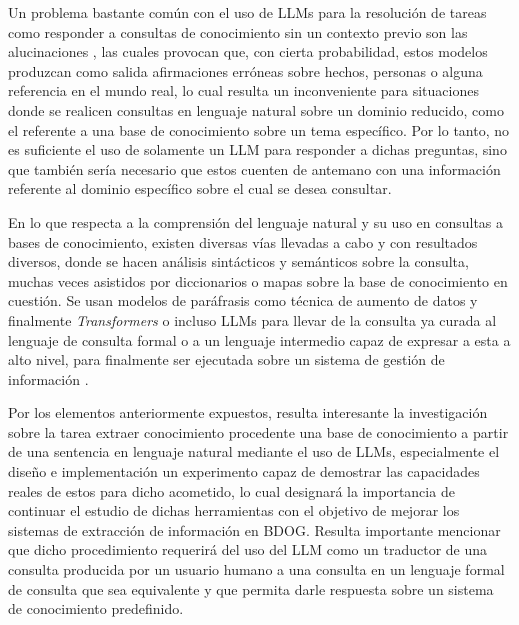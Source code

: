 Un problema bastante común con el uso de LLMs para la resolución de tareas como responder a consultas de conocimiento sin un contexto previo son las alucinaciones \cite{llmhallucinations}, las cuales provocan que, con cierta probabilidad, estos modelos produzcan como salida afirmaciones erróneas sobre hechos, personas o alguna referencia en el mundo real, lo cual resulta un inconveniente para situaciones donde se realicen consultas en lenguaje natural sobre un dominio reducido, como el referente a una base de conocimiento sobre un tema específico. Por lo tanto, no es suficiente el uso de solamente un LLM para responder a dichas preguntas, sino que también sería necesario que estos cuenten de antemano con una información referente al dominio específico sobre el cual se desea consultar.

En lo que respecta a la comprensión del lenguaje natural y su uso en consultas a bases de conocimiento, existen diversas vías llevadas a cabo y con resultados diversos, donde se hacen análisis sintácticos y semánticos sobre la consulta, muchas veces asistidos por diccionarios o mapas sobre la base de conocimiento en cuestión. Se usan modelos de paráfrasis como técnica de aumento de datos y finalmente \textit{Transformers} o incluso LLMs para llevar de la consulta ya curada al lenguaje de consulta formal o a un lenguaje intermedio capaz de expresar a esta a alto nivel, para finalmente ser ejecutada sobre un sistema de gestión de información \cite{text2sql1} \cite{text2cypher1}.

Por los elementos anteriormente expuestos, resulta interesante la investigación sobre la tarea extraer conocimiento procedente una base de conocimiento a partir de una sentencia en lenguaje natural mediante el uso de LLMs, especialmente el diseño e implementación un experimento capaz de demostrar las capacidades reales de estos para dicho acometido, lo cual designará la importancia de continuar el estudio de dichas herramientas con el objetivo de mejorar los sistemas de extracción de información en BDOG. Resulta importante mencionar que dicho procedimiento requerirá del uso del LLM como un traductor de una consulta producida por un usuario humano a una consulta en un lenguaje formal de consulta que sea equivalente y que permita darle respuesta sobre un sistema de conocimiento predefinido.

